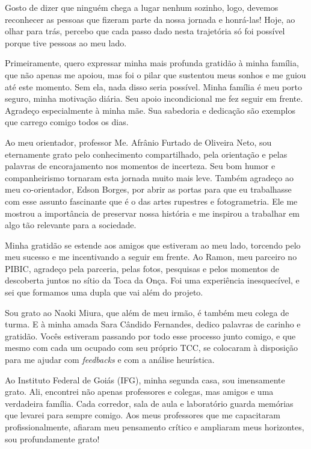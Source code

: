 Gosto de dizer que ninguém chega a lugar nenhum sozinho, logo, devemos reconhecer as pessoas que fizeram parte da nossa jornada e honrá-las! Hoje, ao olhar para trás, percebo que cada passo dado nesta trajetória só foi possível porque tive pessoas ao meu lado.

Primeiramente, quero expressar minha mais profunda gratidão à minha família, que não apenas me apoiou, mas foi o pilar que sustentou meus sonhos e me guiou até este momento. Sem ela, nada disso seria possível. Minha família é meu porto seguro, minha motivação diária. Seu apoio incondicional me fez seguir em frente. Agradeço especialmente à minha mãe. Sua sabedoria e dedicação são exemplos que carrego comigo todos os dias.

Ao meu orientador, professor Me. Afrânio Furtado de Oliveira Neto, sou eternamente grato pelo conhecimento compartilhado, pela orientação e pelas palavras de encorajamento nos momentos de incerteza. Seu bom humor e companheirismo tornaram esta jornada muito mais leve. Também agradeço ao meu co-orientador, Edson Borges, por abrir as portas para que eu trabalhasse com esse assunto fascinante que é o das artes rupestres e fotogrametria. Ele me mostrou a importância de preservar nossa história e me inspirou a trabalhar em algo tão relevante para a sociedade.

Minha gratidão se estende aos amigos que estiveram ao meu lado, torcendo pelo meu sucesso e me incentivando a seguir em frente. Ao Ramon, meu parceiro no PIBIC, agradeço pela parceria, pelas fotos, pesquisas e pelos momentos de descoberta juntos no sítio da Toca da Onça. Foi uma experiência inesquecível, e sei que formamos uma dupla que vai além do projeto.

Sou grato ao Naoki Miura, que além de meu irmão, é também meu colega de turma. E à minha amada Sara Cândido Fernandes, dedico palavras de carinho e gratidão. Vocês estiveram passando por todo esse processo junto comigo, e que mesmo com cada um ocupado com seu próprio TCC, se colocaram à disposição para me ajudar com \textit{feedbacks} e com a análise heurística.

Ao Instituto Federal de Goiás (IFG), minha segunda casa, sou imensamente grato. Ali, encontrei não apenas professores e colegas, mas amigos e uma verdadeira família. Cada corredor, sala de aula e laboratório guarda memórias que levarei para sempre comigo. Aos meus professores que me capacitaram profissionalmente, afiaram meu pensamento crítico e ampliaram meus horizontes, sou profundamente grato!

